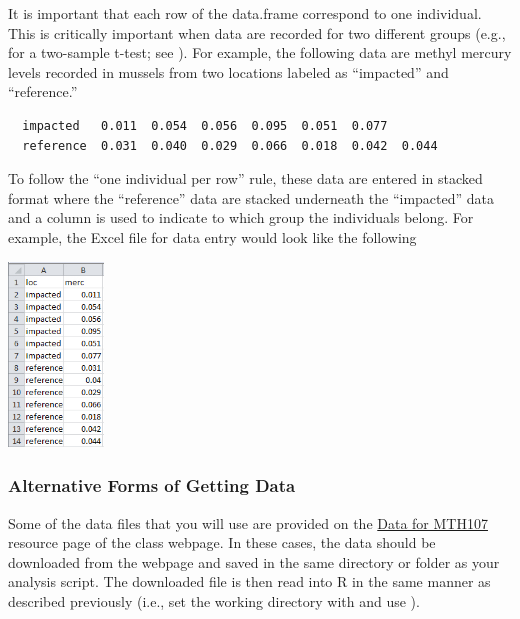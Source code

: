 \documentclass[10pt,openany]{book}\usepackage[]{graphicx}\usepackage[]{color}
\begin{document}

It is important that each row of the data.frame correspond to one individual.  This is critically important when data are recorded for two different groups (e.g., for a two-sample t-test; see ).  For example, the following data are methyl mercury levels recorded in mussels from two locations labeled as ``impacted'' and ``reference.''
\begin{Verbatim}
  impacted   0.011  0.054  0.056  0.095  0.051  0.077
  reference  0.031  0.040  0.029  0.066  0.018  0.042  0.044
\end{Verbatim}
To follow the ``one individual per row'' rule, these data are entered in stacked format where the ``reference'' data are stacked underneath the ``impacted'' data and a column is used to indicate to which group the individuals belong.  For example, the Excel file for data entry would look like the following

\begin{center}
  \includegraphics[width=1in]{Figs/StackedData.jpg}
\end{center}


\subsubsection*{Alternative Forms of Getting Data} \label{sect:RAltData}
\vspace{-12pt}
Some of the data files that you will use are provided on the \href{http://derekogle.com/NCMTH107/resources/data_107}{Data for MTH107} resource page of the class webpage.  In these cases, the data should be downloaded from the webpage and saved in the same directory or folder as your analysis script.  The downloaded file is then read into R in the same manner as described previously (i.e., set the working directory with  and use ).
\end{document}
